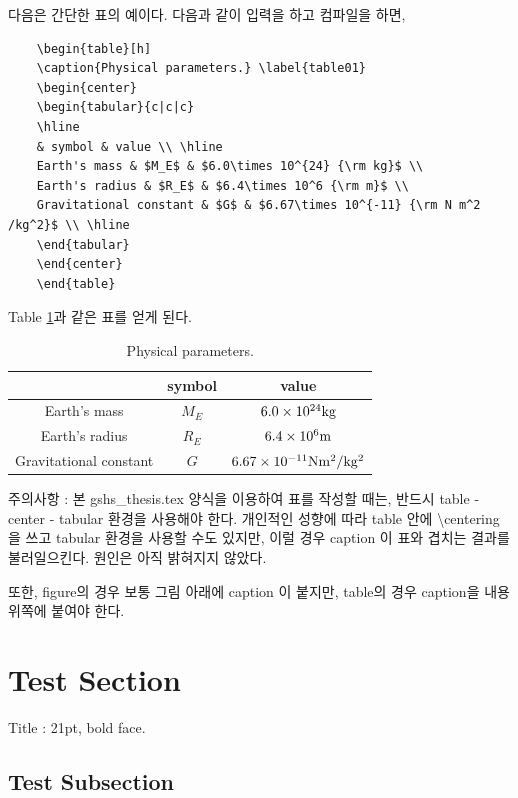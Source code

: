 \documentclass[twoside,11pt]{gshs_thesis}
\begin{document}
다음은 간단한 표의 예이다. 다음과 같이 입력을 하고 컴파일을 하면,
\begin{lstlisting}
	\begin{table}[h]
	\caption{Physical parameters.} \label{table01}
	\begin{center}
	\begin{tabular}{c|c|c}
	\hline
	& symbol & value \\ \hline
	Earth's mass & $M_E$ & $6.0\times 10^{24} {\rm kg}$ \\
	Earth's radius & $R_E$ & $6.4\times 10^6 {\rm m}$ \\
	Gravitational constant & $G$ & $6.67\times 10^{-11} {\rm N m^2 /kg^2}$ \\ \hline
	\end{tabular}
	\end{center}
	\end{table}
\end{lstlisting}
Table \ref{table01}과 같은 표를 얻게 된다.
\begin{table}[h]
\caption{Physical parameters.} \label{table01}
\begin{center}
\begin{tabular}{c|c|c}
\hline
 & symbol & value \\ \hline
Earth's mass & $M_E$ & $6.0\times 10^{24} {\rm kg}$ \\
Earth's radius & $R_E$ & $6.4\times 10^6 {\rm m}$ \\
Gravitational constant & $G$ & $6.67\times 10^{-11} {\rm N m^2 /kg^2}$ \\ \hline
\end{tabular}
\end{center}
\end{table}

주의사항 : 본 gshs\_thesis.tex 양식을 이용하여 표를 작성할 때는, 반드시 table - center - tabular 환경을 사용해야 한다. 개인적인 성향에 따라 table 안에 \textbackslash centering 을 쓰고 tabular 환경을 사용할 수도 있지만, 이럴 경우 caption 이 표와 겹치는 결과를 불러일으킨다. 원인은 아직 밝혀지지 않았다.

또한, figure의 경우 보통 그림 아래에 caption 이 붙지만, table의 경우 caption을 내용 위쪽에 붙여야 한다. 

\section{Test Section}

Title : 21pt, bold face.

\subsection{Test Subsection}
\end{document}
